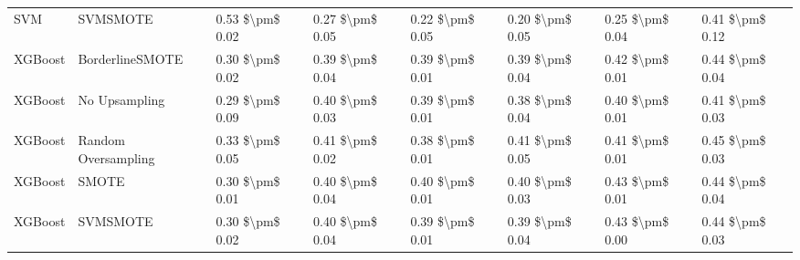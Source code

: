 \begin{tabular}{llllllll}
                            SVM &                      SVMSMOTE & 0.53 \$\textbackslash pm\$ 0.02 &           0.27 \$\textbackslash pm\$ 0.05 &       0.22 \$\textbackslash pm\$ 0.05 &        0.20 \$\textbackslash pm\$ 0.05 &                         0.25 \$\textbackslash pm\$ 0.04 & 0.41 \$\textbackslash pm\$ 0.12 \\
                        XGBoost &               BorderlineSMOTE & 0.30 \$\textbackslash pm\$ 0.02 &           0.39 \$\textbackslash pm\$ 0.04 &       0.39 \$\textbackslash pm\$ 0.01 &        0.39 \$\textbackslash pm\$ 0.04 &                         0.42 \$\textbackslash pm\$ 0.01 & 0.44 \$\textbackslash pm\$ 0.04 \\
                        XGBoost &                 No Upsampling & 0.29 \$\textbackslash pm\$ 0.09 &           0.40 \$\textbackslash pm\$ 0.03 &       0.39 \$\textbackslash pm\$ 0.01 &        0.38 \$\textbackslash pm\$ 0.04 &                         0.40 \$\textbackslash pm\$ 0.01 & 0.41 \$\textbackslash pm\$ 0.03 \\
                        XGBoost &           Random Oversampling & 0.33 \$\textbackslash pm\$ 0.05 &           0.41 \$\textbackslash pm\$ 0.02 &       0.38 \$\textbackslash pm\$ 0.01 &        0.41 \$\textbackslash pm\$ 0.05 &                         0.41 \$\textbackslash pm\$ 0.01 & 0.45 \$\textbackslash pm\$ 0.03 \\
                        XGBoost &                         SMOTE & 0.30 \$\textbackslash pm\$ 0.01 &           0.40 \$\textbackslash pm\$ 0.04 &       0.40 \$\textbackslash pm\$ 0.01 &        0.40 \$\textbackslash pm\$ 0.03 &                         0.43 \$\textbackslash pm\$ 0.01 & 0.44 \$\textbackslash pm\$ 0.04 \\
                        XGBoost &                      SVMSMOTE & 0.30 \$\textbackslash pm\$ 0.02 &           0.40 \$\textbackslash pm\$ 0.04 &       0.39 \$\textbackslash pm\$ 0.01 &        0.39 \$\textbackslash pm\$ 0.04 &                         0.43 \$\textbackslash pm\$ 0.00 & 0.44 \$\textbackslash pm\$ 0.03 \\
\bottomrule
\end{tabular}
